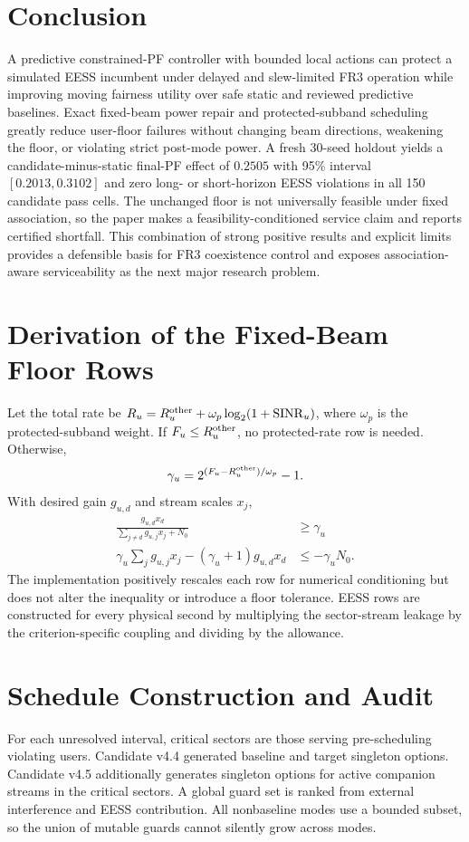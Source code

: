 \documentclass[journal]{IEEEtran}
\begin{document}
\section{Conclusion}
A predictive constrained-PF controller with bounded local actions can protect a simulated EESS incumbent under delayed and slew-limited FR3 operation while improving moving fairness utility over safe static and reviewed predictive baselines. Exact fixed-beam power repair and protected-subband scheduling greatly reduce user-floor failures without changing beam directions, weakening the floor, or violating strict post-mode power. A fresh 30-seed holdout yields a candidate-minus-static final-PF effect of $0.2505$ with 95\% interval $[0.2013,0.3102]$ and zero long- or short-horizon EESS violations in all 150 candidate pass cells. The unchanged floor is not universally feasible under fixed association, so the paper makes a feasibility-conditioned service claim and reports certified shortfall. This combination of strong positive results and explicit limits provides a defensible basis for FR3 coexistence control and exposes association-aware serviceability as the next major research problem.


\appendices
\section{Derivation of the Fixed-Beam Floor Rows}
Let the total rate be $R_{u}=R^{\rm other}_{u}+\omega_p\log_2(1+\mathrm{SINR}_{u})$, where $\omega_p$ is the protected-subband weight. If $F_u\le R^{\rm other}_u$, no protected-rate row is needed. Otherwise,
\begin{equation}
 \gamma_u=2^{(F_u-R^{\rm other}_u)/\omega_p}-1.
\end{equation}
With desired gain $g_{u,d}$ and stream scales $x_j$,
\begin{align}
 \frac{g_{u,d}x_d}{\sum_{j\ne d}g_{u,j}x_j+N_0}&\ge\gamma_u\\
 \gamma_u\sum_j g_{u,j}x_j-(\gamma_u+1)g_{u,d}x_d
 &\le-\gamma_u N_0.
\end{align}
The implementation positively rescales each row for numerical conditioning but does not alter the inequality or introduce a floor tolerance. EESS rows are constructed for every physical second by multiplying the sector-stream leakage by the criterion-specific coupling and dividing by the allowance.

\section{Schedule Construction and Audit}
For each unresolved interval, critical sectors are those serving pre-scheduling violating users. Candidate v4.4 generated baseline and target singleton options. Candidate v4.5 additionally generates singleton options for active companion streams in the critical sectors. A global guard set is ranked from external interference and EESS contribution. All nonbaseline modes use a bounded subset, so the union of mutable guards cannot silently grow across modes.
\end{document}
